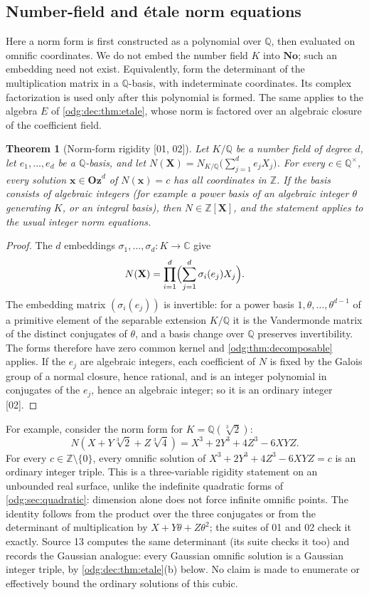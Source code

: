 \documentclass[11pt,oneside]{article}
\numberwithin{equation}{section}
\newtheorem{theorem}{Theorem}[section]
\theoremstyle{definition}
\theoremstyle{remark}
\newcommand{\No}{\mathbf{No}}
\newcommand{\Oz}{\mathbf{Oz}}
\newcommand{\Z}{\mathbb Z}
\newcommand{\Q}{\mathbb Q}
\newcommand{\C}{\mathbb C}
\newcommand{\src}[1]{\textup{\textsf{\small[#1]}}}
\begin{document}
\subsection{Number-field and \'etale norm equations}

Here a norm form is first constructed as a polynomial over $\Q$, then
evaluated on omnific coordinates. We do not embed the number field $K$ into
$\No$; such an embedding need not exist. Equivalently, form the determinant
of the multiplication matrix in a $\Q$-basis, with indeterminate coordinates.
Its complex factorization is used only after this polynomial is formed. The
same applies to the algebra $E$ of \cref{odg:dec:thm:etale}, whose norm is
factored over an algebraic closure of the coefficient field.

\begin{theorem}[Norm-form rigidity \src{01, 02}]\label{odg:thm:norm}
Let $K/\Q$ be a number field of degree $d$, let $e_1,\ldots,e_d$ be a
$\Q$-basis, and let $N(\mathbf X)=N_{K/\Q}\bigl(\sum_{j=1}^d e_jX_j\bigr)$.
For every $c\in\Q^\times$, every solution $\mathbf x\in\Oz^d$ of
$N(\mathbf x)=c$ has all coordinates in $\Z$. If the basis consists of
algebraic integers (for example a power basis of an algebraic integer
$\theta$ generating $K$, or an integral basis), then $N\in\Z[\mathbf X]$,
and the statement applies to the usual integer norm equations.
\end{theorem}
\begin{proof}
The $d$ embeddings $\sigma_1,\ldots,\sigma_d:K\to\C$ give
\[
 N(\mathbf X)=\prod_{i=1}^{d}
 \Bigl(\sum_{j=1}^{d}\sigma_i(e_j)X_j\Bigr).
\]
The embedding matrix $(\sigma_i(e_j))$ is invertible: for a power basis
$1,\theta,\ldots,\theta^{d-1}$ of a primitive element of the separable
extension $K/\Q$ it is the Vandermonde matrix of the distinct conjugates of
$\theta$, and a basis change over $\Q$ preserves invertibility. The forms
therefore have zero common kernel and \cref{odg:thm:decomposable} applies.
If the $e_j$ are algebraic integers, each coefficient of $N$ is fixed by the
Galois group of a normal closure, hence rational, and is an integer
polynomial in conjugates of the $e_j$, hence an algebraic integer; so it is
an ordinary integer \src{02}.
\end{proof}

For example, consider the norm form for $K=\Q(\sqrt[3]{2})$:
\[
 N(X+Y\sqrt[3]{2}+Z\sqrt[3]{4})=X^3+2Y^3+4Z^3-6XYZ.
\]
For every $c\in\Z\setminus\{0\}$, every omnific solution of
$X^3+2Y^3+4Z^3-6XYZ=c$ is an ordinary integer triple. This is a
three-variable rigidity statement on an unbounded real surface, unlike the
indefinite quadratic forms of \cref{odg:sec:quadratic}: dimension alone does
not force infinite omnific points. The identity follows from the product over
the three conjugates or from the determinant of multiplication by
$X+Y\theta+Z\theta^2$; the suites of 01 and 02 check it exactly. Source 13
computes the same determinant (its suite checks it too) and records the
Gaussian analogue: every Gaussian omnific solution is a Gaussian integer
triple, by \cref{odg:dec:thm:etale}(b) below. No claim is made to enumerate or
effectively bound the ordinary solutions of this cubic.
\end{document}
